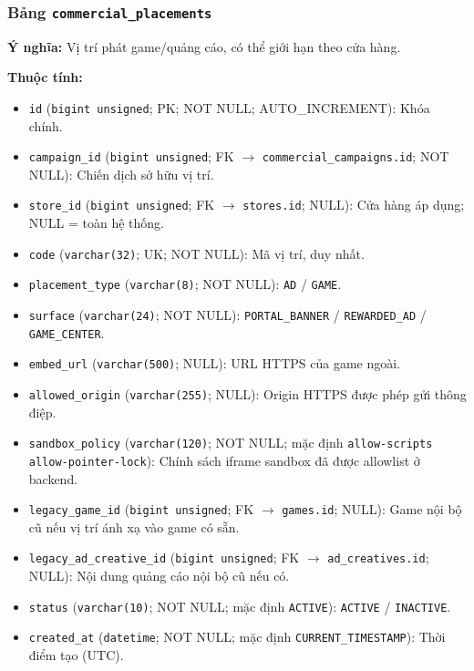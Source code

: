 \subsubsection{Bảng \texttt{commercial\_placements}}

\textbf{Ý nghĩa:} Vị trí phát game/quảng cáo, có thể giới hạn theo cửa hàng.\par

\textbf{Thuộc tính:}

\begin{itemize}

\item \texttt{id} (\texttt{bigint unsigned}; PK; NOT NULL; AUTO_INCREMENT): Khóa chính.

\item \texttt{campaign\_id} (\texttt{bigint unsigned}; FK $\rightarrow$ \texttt{commercial\_campaigns.id}; NOT NULL): Chiến dịch sở hữu vị trí.

\item \texttt{store\_id} (\texttt{bigint unsigned}; FK $\rightarrow$ \texttt{stores.id}; NULL): Cửa hàng áp dụng; NULL = toàn hệ thống.

\item \texttt{code} (\texttt{varchar(32)}; UK; NOT NULL): Mã vị trí, duy nhất.

\item \texttt{placement\_type} (\texttt{varchar(8)}; NOT NULL): \texttt{AD} / \texttt{GAME}.

\item \texttt{surface} (\texttt{varchar(24)}; NOT NULL): \texttt{PORTAL\_BANNER} / \texttt{REWARDED\_AD} / \texttt{GAME\_CENTER}.

\item \texttt{embed\_url} (\texttt{varchar(500)}; NULL): URL HTTPS của game ngoài.

\item \texttt{allowed\_origin} (\texttt{varchar(255)}; NULL): Origin HTTPS được phép gửi thông điệp.

\item \texttt{sandbox\_policy} (\texttt{varchar(120)}; NOT NULL; mặc định \texttt{allow-scripts allow-pointer-lock}): Chính sách iframe sandbox đã được allowlist ở backend.

\item \texttt{legacy\_game\_id} (\texttt{bigint unsigned}; FK $\rightarrow$ \texttt{games.id}; NULL): Game nội bộ cũ nếu vị trí ánh xạ vào game có sẵn.

\item \texttt{legacy\_ad\_creative\_id} (\texttt{bigint unsigned}; FK $\rightarrow$ \texttt{ad\_creatives.id}; NULL): Nội dung quảng cáo nội bộ cũ nếu có.

\item \texttt{status} (\texttt{varchar(10)}; NOT NULL; mặc định \texttt{ACTIVE}): \texttt{ACTIVE} / \texttt{INACTIVE}.

\item \texttt{created\_at} (\texttt{datetime}; NOT NULL; mặc định \texttt{CURRENT\_TIMESTAMP}): Thời điểm tạo (UTC).

\end{itemize}

